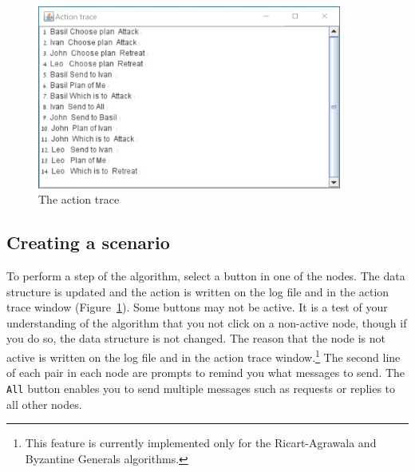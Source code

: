 \documentclass[11pt]{article}
\newcommand{\p}[1]{\texttt{#1}}
\begin{document}
\begin{figure}[htb]
\begin{center}
\includegraphics[width=10cm,keepaspectratio=true]{trace.jpg}
\end{center}
\caption{The action trace}\label{fig2}
\end{figure}

\subsection{Creating a scenario}
To perform a step of the algorithm, select a button in one of the nodes.
The data structure is updated and the action is written on the log file
and in the action trace window (Figure~\ref{fig2}).
Some buttons may not be active. It is a test of your understanding of the
algorithm that you not click on a non-active node, though if you do so,
the data structure is not changed. The reason that the node is not active
is written on the log file and
in the action trace window.\footnote{This feature is currently implemented
only for the Ricart-Agrawala
and Byzantine Generals algorithms.}
The second line of each pair in each node are prompts to remind you what messages to send.
The \p{All} button enables you to send multiple messages such as requests
or replies to all other nodes.

\newpage
\end{document}
